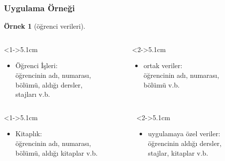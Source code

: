 \documentclass[dvipsnames]{beamer}
\theoremstyle{definition}
\theoremstyle{example}
\newtheorem{ornek}[theorem]{Örnek}
\theoremstyle{plain}
\begin{document}
\begin{frame}
  \frametitle{Uygulama Örneği}

  \begin{ornek}[öğrenci verileri]
    \begin{columns}[t]
      \begin{column}<1->{5.1cm}
      \begin{itemize}
        \item Öğrenci İşleri:\\
          öğrencinin adı, numarası,\\
          bölümü, aldığı dersler,\\
          stajları v.b.
      \end{itemize}
      \end{column}

      \begin{column}<2->{5.1cm}
      \begin{itemize}
        \item ortak veriler:\\
          öğrencinin adı, numarası,\\
          bölümü v.b.
      \end{itemize}
      \end{column}
    \end{columns}

    \begin{columns}[t]
      \begin{column}<1->{5.1cm}
      \begin{itemize}
        \item Kitaplık:\\
          öğrencinin adı, numarası,\\
          bölümü, aldığı kitaplar v.b.
      \end{itemize}
      \end{column}

      \begin{column}<2->{5.1cm}
      \begin{itemize}
        \item uygulamaya özel veriler:\\
          öğrencinin aldığı dersler,\\
          stajlar, kitaplar v.b.
      \end{itemize}
      \end{column}
    \end{columns}
  \end{ornek}
\end{frame}
\end{document}
